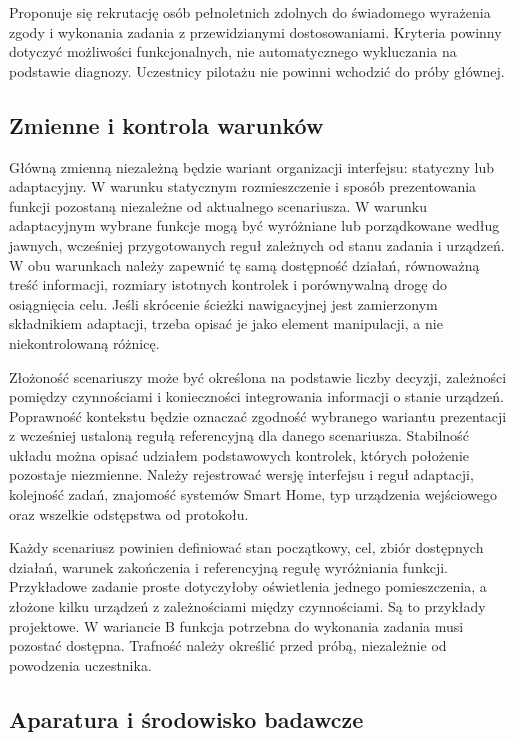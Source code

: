 \documentclass[11pt,a4paper]{article}
\begin{document}
Proponuje się rekrutację osób pełnoletnich zdolnych do świadomego wyrażenia zgody i wykonania zadania z przewidzianymi dostosowaniami. Kryteria powinny dotyczyć możliwości funkcjonalnych, nie automatycznego wykluczania na podstawie diagnozy. Uczestnicy pilotażu nie powinni wchodzić do próby głównej.

\subsection{Zmienne i kontrola warunków}

Główną zmienną niezależną będzie wariant organizacji interfejsu: statyczny lub adaptacyjny. W warunku statycznym rozmieszczenie i sposób prezentowania funkcji pozostaną niezależne od aktualnego scenariusza. W warunku adaptacyjnym wybrane funkcje mogą być wyróżniane lub porządkowane według jawnych, wcześniej przygotowanych reguł zależnych od stanu zadania i urządzeń. W obu warunkach należy zapewnić tę samą dostępność działań, równoważną treść informacji, rozmiary istotnych kontrolek i porównywalną drogę do osiągnięcia celu. Jeśli skrócenie ścieżki nawigacyjnej jest zamierzonym składnikiem adaptacji, trzeba opisać je jako element manipulacji, a nie niekontrolowaną różnicę.

Złożoność scenariuszy może być określona na podstawie liczby decyzji, zależności pomiędzy czynnościami i konieczności integrowania informacji o stanie urządzeń. Poprawność kontekstu będzie oznaczać zgodność wybranego wariantu prezentacji z wcześniej ustaloną regułą referencyjną dla danego scenariusza. Stabilność układu można opisać udziałem podstawowych kontrolek, których położenie pozostaje niezmienne. Należy rejestrować wersję interfejsu i reguł adaptacji, kolejność zadań, znajomość systemów Smart Home, typ urządzenia wejściowego oraz wszelkie odstępstwa od protokołu.

Każdy scenariusz powinien definiować stan początkowy, cel, zbiór dostępnych działań, warunek zakończenia i referencyjną regułę wyróżniania funkcji. Przykładowe zadanie proste dotyczyłoby oświetlenia jednego pomieszczenia, a złożone kilku urządzeń z zależnościami między czynnościami. Są to przykłady projektowe. W wariancie B funkcja potrzebna do wykonania zadania musi pozostać dostępna. Trafność należy określić przed próbą, niezależnie od powodzenia uczestnika.

\subsection{Aparatura i środowisko badawcze}
\end{document}
